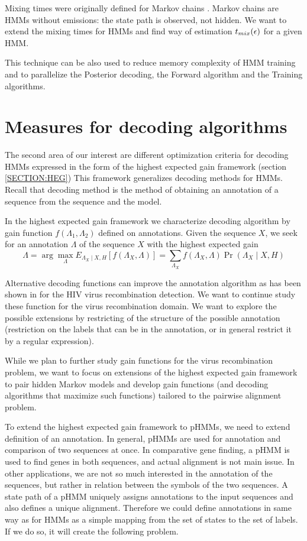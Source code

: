 Mixing times were originally defined for Markov chains \cite{Levin2006}. Markov
chains are HMMs without emissions: the state path is observed, not hidden. We
want to extend the mixing times for HMMs and find way of estimation $t_{mix}(\epsilon)$ for
a given HMM.

This technique can be also used to reduce memory complexity of HMM training and
to parallelize the Posterior decoding, the Forward algorithm and the
Training algorithms.

\section{Measures for decoding algorithms}

The second area of our interest are different optimization criteria for decoding
HMMs expressed in the form of the highest expected gain framework (section
\ref{SECTION:HEG}) This framework generalizes decoding methods for HMMs. Recall
that decoding method is the method of obtaining an annotation of a sequence from
the sequence and the model. 

In the highest expected gain framework we characterize decoding algorithm by
gain function $f(\Lambda_1,\Lambda_2)$ defined on annotations. Given the
sequence $X$, we seek for an annotation $\Lambda$ of the sequence $X$ with the
highest expected gain \[\Lambda = \arg\max_{\Lambda} E_{\Lambda_X\mid
X,H}[f(\Lambda_X,\Lambda)] =
\sum_{\Lambda_X}f(\Lambda_X,\Lambda)\Pr\left(\Lambda_X\mid X,H\right) \]


Alternative
decoding functions can improve the annotation algorithm as has been shown in
\cite{Nanasi2010,Truszkowski2011} for the HIV virus recombination detection.
We want to continue study these function for the virus recombination domain. We
want to explore the  possible extensions by restricting of the structure of the
possible annotation (restriction on the labels that can be in the annotation, or
in general restrict it by a regular expression).

While we plan to further study gain functions for the virus recombination
problem, we want to focus on extensions of the highest expected gain framework to
pair hidden Markov models and develop gain functions (and decoding algorithms
that maximize such functions) tailored to the pairwise alignment problem. 

To extend the highest expected gain framework to pHMMs, we need to extend
definition of an annotation. In general, pHMMs are used for annotation and
comparison of two sequences at once. In comparative gene finding, a pHMM is used
to find genes in both sequences, and actual alignment is not main issue. In
other applications, we are not so much interested in the annotation of the
sequences, but rather in relation between the symbols of the two sequences. A
state path of a pHMM uniquely assigns annotations to the input sequences and
also defines a unique alignment.  Therefore we could define annotations in same
way as for HMMs as a simple mapping from the set of states to the set of labels.
If we do so, it will create the following problem.

